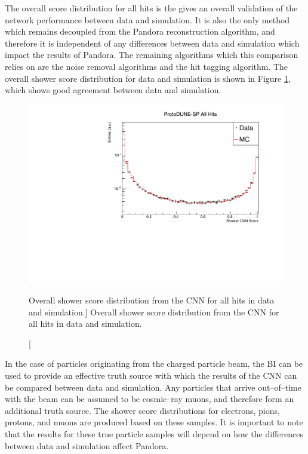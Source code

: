 The overall score distribution for all hits is the gives an overall validation
of the network performance between data and simulation. It is also the only
method which remains decoupled from the Pandora reconstruction algorithm, and
therefore it is independent of any differences between data and simulation which
impact the results of Pandora. The remaining algorithms which this comparison
relies on are the noise removal algorithms and the hit tagging algorithm. The
overall shower score distribution for data and simulation is shown in Figure
\ref{fig:cnn_overall_score}, which shows good agreement between data and
simulation.
\begin{figure}
	\centering
	\includegraphics[width=\textwidth]{figures/hit_cnn_all.pdf}
	\caption
	[Overall shower score distribution from the CNN for all hits in data and simulation.]
	{Overall shower score distribution from the CNN for all hits in data and simulation.}
	\label{fig:cnn_overall_score}
\end{figure}

In the case of particles originating from the charged particle beam, the BI can
be used to provide an effective truth source with which the results of the CNN 
can be compared between data and simulation. Any particles that arrive
out--of--time with the beam can be assumed to be cosmic--ray muons, and 
therefore form an additional truth source. The shower score distributions for
electrons, pions, protons, and muons are produced based on these samples. It is
important to note that the results for these true particle samples will depend 
on how the differences between data and simulation affect Pandora.


